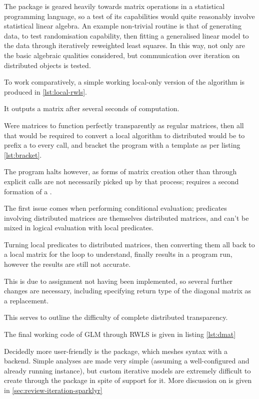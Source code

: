 The package is geared heavily towards matrix operations in a statistical programming language, so a test of its capabilities would quite reasonably involve statistical linear algebra.
An example non-trivial routine is that of generating data, to test randomisation capability, then fitting a generalised linear model to the data through iteratively reweighted least squares.
In this way, not only are the basic algebraic qualities considered, but communication over iteration on distributed objects is tested.

To work comparatively, a simple working local-only version of the algorithm is produced in \cref{lst:local-rwls}.


It outputs a  matrix after several seconds of computation.

Were  matrices to function perfectly transparently as regular matrices, then all that would be required to convert a local algorithm to distributed would be to prefix a  to every  call, and bracket the program with a template as per listing \cref{lst:bracket}.


The program halts however, as forms of matrix creation other than through explicit  calls are not necessarily picked up by that process;  requires a second formation of a .

The first issue comes when performing conditional evaluation; predicates involving distributed matrices are themselves distributed matrices, and can't be mixed in logical evaluation with local predicates.

Turning local predicates to distributed matrices, then converting them all back to a local matrix for the loop to understand, finally results in a program run, however the results are still not accurate.

This is due to  assignment not having been implemented, so several further changes are necessary, including specifying return type of the diagonal matrix as a replacement.

This serves to outline the difficulty of complete distributed transparency.

The final working code of  GLM through RWLS is given in listing \cref{lst:dmat}


Decidedly more user-friendly is the  package, which meshes  syntax with a  backend.
Simple analyses are made very simple (assuming a well-configured and already running  instance), but custom iterative models are extremely difficult to create through the package in spite of  support for it.
More discussion on  is given in \cref{sec:review-iteration-sparklyr}
